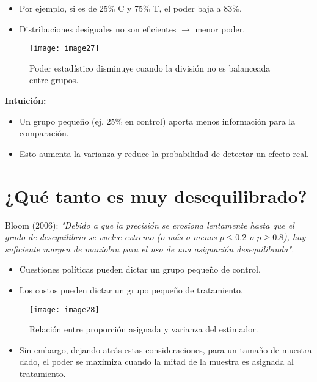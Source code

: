 \documentclass[12pt]{article}
\begin{document}
\begin{itemize}
    \item Por ejemplo, si es de 25\% C y 75\% T, el poder baja a 83\%.
    \item Distribuciones desiguales no son eficientes $\rightarrow$ menor poder.
\end{itemize}

\begin{figure}[H]
    \centering
    \texttt{[image: image27]}
    \caption{\footnotesize Poder estadístico disminuye cuando la división no es balanceada entre grupos.}
\end{figure}

\textbf{Intuición:}
\begin{itemize}
    \item Un grupo pequeño (ej. 25\% en control) aporta menos información para la comparación.  
    \item Esto aumenta la varianza y reduce la probabilidad de detectar un efecto real.  
\end{itemize}

\section*{\noindent\textbf{¿Qué tanto es muy desequilibrado?}}

\noindent Bloom (2006): 
\textit{"Debido a que la precisión se erosiona lentamente hasta que el grado de desequilibrio se vuelve extremo 
(o más o menos $p \leq 0.2$ o $p \geq 0.8$), hay suficiente margen de maniobra para el uso de una asignación desequilibrada".} 

\begin{itemize}
    \item Cuestiones políticas pueden dictar un grupo pequeño de control.  
    \item Los costos pueden dictar un grupo pequeño de tratamiento.  
\end{itemize}

\begin{figure}[H]
    \centering
    \texttt{[image: image28]}
    \caption{\footnotesize Relación entre proporción asignada y varianza del estimador.}
\end{figure}

\begin{itemize}
    \item Sin embargo, dejando atrás estas consideraciones, para un tamaño de muestra dado, el poder se maximiza cuando la mitad de la muestra es asignada al tratamiento.  
\end{itemize}
\end{document}
